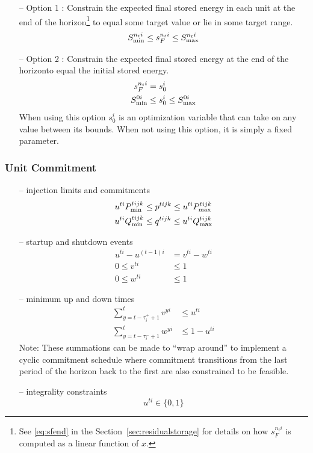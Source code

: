 \documentclass[12pt]{article}
\numberwithin{equation}{section}
\numberwithin{table}{section}
\numberwithin{figure}{section}
\begin{document}
\begin{itemize}
\begin{itemize}
\item[--] Option 1 : Constrain the expected final stored energy in each unit at the end of the horizon\footnote{See \eqref{eq:sfend} in the Section~\ref{sec:residualstorage} for details on how $s_F^{n_ti}$ is computed as a linear function of $x$.} to equal some target value or lie in some target range.
\begin{equation}
S_{\rm min}^{n_ti} \le s_F^{n_ti} \le S_{\rm max}^{n_ti} \label{eq:sftarget}
\end{equation}
\item[--] Option 2 : Constrain the expected final stored energy at the end of the horizon\footnotemark[\value{footnote}] to equal the initial stored energy.
\begin{align}
s_F^{n_ti} &= s_0^i \label{eq:sfequals0} \\
S_{\rm min}^{0i} &\le s_0^i \le S_{\rm max}^{0i} \label{eq:s0bounds}
\end{align}
When using this option $s_0^i$ is an optimization variable that can take on any value between its bounds. When not using this option, it is simply a fixed parameter.
\end{itemize}

\end{itemize}

\subsubsection*{Unit Commitment}
\begin{itemize}
\item[--] injection limits and commitments
\begin{align}
 u^{ti} P_{\rm min}^{tijk} & \leq p^{tijk} \leq u^{ti} P_{\rm max}^{tijk} \\
 u^{ti} Q_{\rm min}^{tijk} & \leq q^{tijk}  \leq u^{ti} Q_{\rm max}^{tijk}
\end{align}
\item[--] startup and shutdown events
\begin{align}
 u^{ti} - u^{(t-1)i} &= v^{ti} - w^{ti} \\
 0 \le v^{ti} &\le 1 \\
 0 \le w^{ti} &\le 1
\end{align}
\item[--] minimum up and down times
\begin{align}
 \sum_{y=t-\tau_i^+ + 1}^t v^{yi} & \le u^{ti} \\
 \sum_{y=t-\tau_i^- + 1}^t w^{yi} & \le 1 - u^{ti}
\end{align}
Note: These summations can be made to ``wrap around'' to implement a cyclic commitment schedule where commitment transitions from the last period of the horizon back to the first are also constrained to be feasible.
\item[--] integrality constraints
\begin{equation}
u^{ti} \in \{0,1\}
\end{equation}
\end{itemize}
\end{document}
